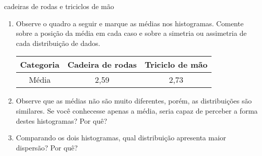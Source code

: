 \begin{task}{cadeiras de rodas e triciclos de mão}
\begin{enumerate}
\item {} 
Observe o quadro a seguir e marque as médias nos histogramas. Comente sobre a posição da média em cada caso e sobre a simetria ou assimetria de cada distribuição de dados.

\begin{savenotes}\sphinxattablestart
\centering
{}
\label{\detokenize{PE104-2:id8}}
\sphinxaftercaption
\begin{tabulary}{\linewidth}[t]{|c|c|c|}
\hline

Categoria
&
Cadeira de rodas
&
Triciclo de mão
\\
\hline
Média
&
2,59
&
2,73
\\
\hline
\end{tabulary}
\par
\sphinxattableend\end{savenotes}

\item {} 
Observe que as médias não são muito diferentes, porém, as distribuições são similares. Se você conhecesse apenas a média, seria capaz de perceber a forma destes histogramas? Por quê?

\item {} 
Comparando os dois histogramas, qual distribuição apresenta maior dispersão? Por quê?

\end{enumerate}
\end{task}

